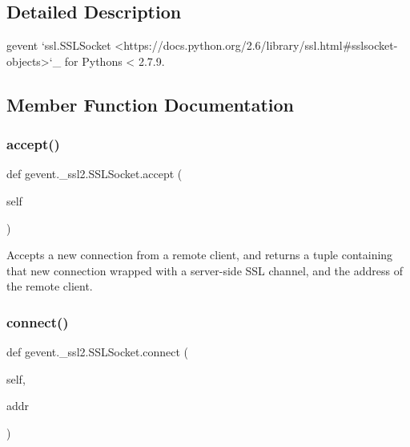 \subsection{Detailed Description}
\begin{DoxyVerb}gevent `ssl.SSLSocket <https://docs.python.org/2.6/library/ssl.html#sslsocket-objects>`_
for Pythons < 2.7.9.
\end{DoxyVerb}
 

\subsection{Member Function Documentation}
\mbox{\label{classgevent_1_1__ssl2_1_1_s_s_l_socket_accf322eecb3305a7743613dd6c3f9fa5}} 
\subsubsection{\texorpdfstring{accept()}{accept()}}
{\footnotesize\ttfamily def gevent.\+\_\+ssl2.\+S\+S\+L\+Socket.\+accept (\begin{DoxyParamCaption}\item[{}]{self }\end{DoxyParamCaption})}

\begin{DoxyVerb}Accepts a new connection from a remote client, and returns
a tuple containing that new connection wrapped with a server-side
SSL channel, and the address of the remote client.\end{DoxyVerb}
 \mbox{\label{classgevent_1_1__ssl2_1_1_s_s_l_socket_a244abd0b9d1c7d23a9695c2c7f2e0d32}} 
\subsubsection{\texorpdfstring{connect()}{connect()}}
{\footnotesize\ttfamily def gevent.\+\_\+ssl2.\+S\+S\+L\+Socket.\+connect (\begin{DoxyParamCaption}\item[{}]{self,  }\item[{}]{addr }\end{DoxyParamCaption})}

